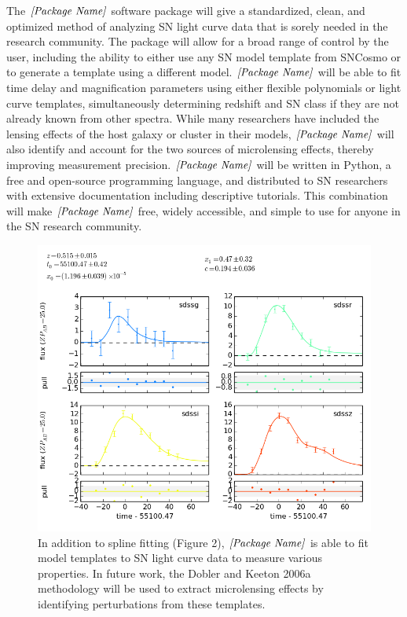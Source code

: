The $\textit{[Package Name]}$ software package will give a standardized, clean, and optimized method of analyzing SN light curve data that is sorely needed in the research community. The package will allow for a broad range of control by the user, including the ability to either use any SN model template from SNCosmo or to generate a template using a different model. $\textit{[Package Name]}$ will be able to fit time delay and magnification parameters using either flexible polynomials or light curve templates, simultaneously determining redshift and SN class if they are not already known from other spectra. While many researchers have included the lensing effects of the host galaxy or cluster in their models, $\textit{[Package Name]}$ will also identify and account for the two sources of microlensing effects, thereby improving measurement precision. $\textit{[Package Name]}$ will be written in Python, a free and open-source programming language, and distributed to SN researchers with extensive documentation including descriptive tutorials. This combination will make $\textit{[Package Name]}$ free, widely accessible, and simple to use for anyone in the SN research community.		

\begin{figure}[h]
\centering
\includegraphics[scale=.4]{sncosmo.png}
\caption{In addition to spline fitting (Figure 2), $\textit{[Package Name]}$ is able to fit model templates to SN light curve data to measure various properties. In future work, the Dobler and Keeton 2006a methodology will be used to extract microlensing effects by identifying perturbations from these templates.}
\end{figure}


